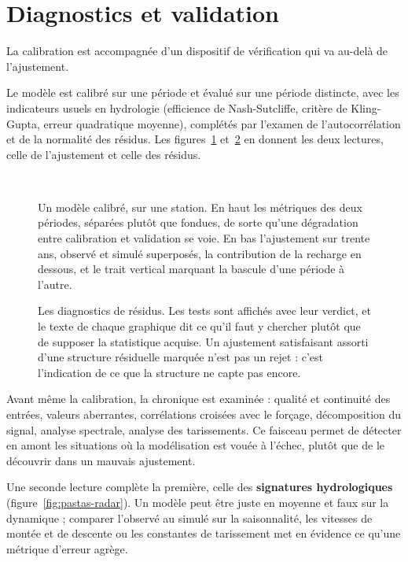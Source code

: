 \section{Diagnostics et validation}

La calibration est accompagnée d'un dispositif de vérification qui va au-delà de l'ajustement.

Le modèle est calibré sur une période et évalué sur une période distincte, avec les indicateurs usuels en hydrologie (efficience de
Nash-Sutcliffe, critère de Kling-Gupta, erreur quadratique moyenne), complétés par l'examen de
l'autocorrélation et de la normalité des résidus. Les figures~\ref{fig:pastas-ajustement}
et~\ref{fig:pastas-diagnostics} en donnent les deux lectures, celle de l'ajustement et celle des
résidus.

\begin{figure}[htbp]
\centering
{}\\[0.35em]
\caption{Un modèle calibré, sur une station. En haut les métriques des deux périodes, séparées
plutôt que fondues, de sorte qu'une dégradation entre calibration et validation se voie. En bas
l'ajustement sur trente ans, observé et simulé superposés, la contribution de la recharge en
dessous, et le trait vertical marquant la bascule d'une période à l'autre. \lecas}
\label{fig:pastas-ajustement}
\end{figure}

\begin{figure}[htbp]
\centering
{}
\caption{Les diagnostics de résidus. Les tests sont affichés avec leur verdict, et le texte de
chaque graphique dit ce qu'il faut y chercher plutôt que de supposer la statistique acquise. Un
ajustement satisfaisant assorti d'une structure résiduelle marquée n'est pas un rejet : c'est
l'indication de ce que la structure ne capte pas encore.}
\label{fig:pastas-diagnostics}
\end{figure}

Avant même la calibration, la chronique est examinée :
qualité et continuité des entrées, valeurs aberrantes, corrélations croisées avec le forçage,
décomposition du signal, analyse spectrale, analyse des tarissements. Ce faisceau permet de
détecter en amont les situations où la modélisation est vouée à l'échec, plutôt que de le
découvrir dans un mauvais ajustement.

Une seconde lecture complète la première, celle des \textbf{signatures hydrologiques}
(figure~\ref{fig:pastas-radar}). Un modèle peut être juste en moyenne et faux sur la dynamique ;
comparer l'observé au simulé sur la saisonnalité, les vitesses de montée et de descente ou les
constantes de tarissement met en évidence ce qu'une métrique d'erreur agrège.

